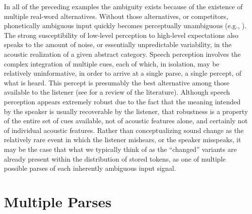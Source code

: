 In all of the preceding examples the ambiguity exists because of the
existence of multiple real-word alternatives. Without those alternatives,
or competitors, phonetically ambiguous input quickly becomes perceptually
unambiguous (e.g., \citealp{warren1970perceptual,ganong1980phonetic}).
The strong susceptibility of low-level perception to high-level expectations
also speaks to the amount of noise, or essentially unpredictable variability,
in the acoustic realization of a given abstract category. Speech perception
involves the complex integration of multiple cues, each of which,
in isolation, may be relatively uninformative, in order to arrive
at a single parse, a single percept, of what is heard. This percept
is presumably the best alternative among those available to the listener
(see \citet{davis2007hearing} for a review of the literature). Although
speech perception appears extremely robust due to the fact that the
meaning intended by the speaker is usually recoverable by the listener,
that robustness is a property of the entire set of cues available,
not of acoustic features alone, and certainly not of individual acoustic
features. Rather than conceptualizing sound change as the relatively
rare event in which the listener mishears, or the speaker misspeaks,
it may be the case that what we typically think of as the “changed”
variants are already present within the distribution of stored tokens,
as one of multiple possible parses of each inherently ambiguous input
signal.

\section{Multiple Parses}

